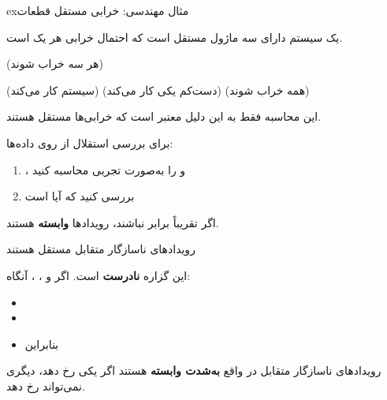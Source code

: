 \begin{PSbox}[unbreakable]{ex}{مثال مهندسی: خرابی مستقل قطعات}

یک سیستم دارای سه ماژول مستقل است که احتمال خرابی هر یک  است.

(هر سه خراب شوند) 

(سیستم کار می‌کند) (دست‌کم یکی کار می‌کند) (همه خراب شوند) 

این محاسبه فقط به این دلیل معتبر است که خرابی‌ها مستقل هستند.

\end{PSbox}


برای بررسی استقلال از روی داده‌ها:

\begin{enumerate}
\def\labelenumi{\arabic{enumi}.}
\tightlist
\item
  ،  و  را به‌صورت تجربی محاسبه کنید
\item
  بررسی کنید که آیا  است
\end{enumerate}

اگر تقریباً برابر نباشند، رویدادها \textbf{وابسته} هستند.


\begin{PSquote}

رویدادهای ناسازگار متقابل مستقل هستند

\end{PSquote}

این گزاره \textbf{نادرست} است. اگر  و ، ، آنگاه:

\begin{itemize}
\tightlist
\item
\item
\item
  بنابراین 
\end{itemize}

رویدادهای ناسازگار متقابل در واقع \textbf{به‌شدت وابسته} هستند  اگر یکی رخ دهد، دیگری نمی‌تواند رخ دهد.


